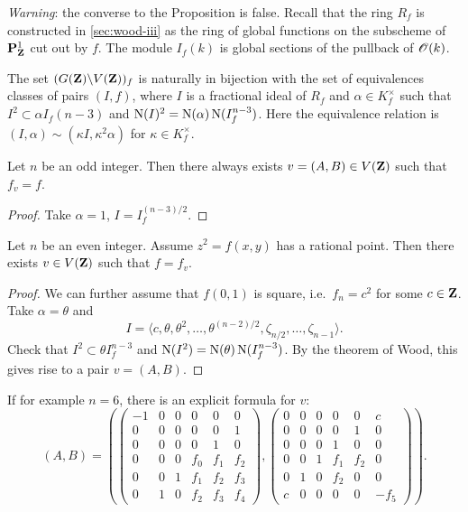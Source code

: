 \emph{Warning}: the converse to the Proposition is false. Recall that the 
ring $R_f$ is constructed in \autoref{sec:wood-iii} as the ring of global 
functions on the subscheme of $\mathbf{P}_{\mathbf{Z}}^1$ cut out by $f$. The module 
$I_f(k)$ is global sections of the pullback of $\mathscr{O}(k)$. 

\begin{theo}[Wood]
The set $(G(\mathbf{Z})\backslash V(\mathbf{Z}))_f$ is naturally in bijection with the set of 
equivalences classes of pairs $(I,f)$, where $I$ is a fractional ideal of $R_f$ 
and $\alpha\in K_f^\times$ such that $I^2\subset \alpha I_f(n-3)$ and 
$\operatorname{N}(I)^2 = \operatorname{N}(\alpha)\operatorname{N}(I_f^{n-3})$. Here the equivalence relation is 
$(I,\alpha)\sim (\kappa I,\kappa^2\alpha)$ for $\kappa\in K_f^\times$. 
\end{theo}

\begin{theo}
Let $n$ be an odd integer. Then there always exists $v=(A,B)\in V(\mathbf{Z})$ such 
that $f_v=f$. 
\end{theo}
\begin{proof}
Take $\alpha=1$, $I=I_f^{(n-3)/2}$. 
\end{proof}

\begin{theo}
Let $n$ be an even integer. Assume $z^2=f(x,y)$ has a rational point. Then 
there exists $v\in V(\mathbf{Z})$ such that $f=f_v$. 
\end{theo}
\begin{proof}
We can further assume that $f(0,1)$ is square, i.e.~$f_n=c^2$ for some 
$c\in \mathbf{Z}$. Take $\alpha=\theta$ and 
\[
  I=\langle c,\theta,\theta^2,\dots,\theta^{(n-2)/2},\zeta_{n/2},\dots,\zeta_{n-1}\rangle .
\]
Check that $I^2\subset \theta I_f^{n-3}$ and 
$\operatorname{N}(I^2)=\operatorname{N}(\theta)\operatorname{N}(I_f^{n-3})$. By the theorem of Wood, this gives 
rise to a pair $v=(A,B)$. 
\end{proof}

If for example $n=6$, there is an explicit formula for $v$: 
\[
  (A,B) = \left(
  \begin{pmatrix} 
    -1 & 0 & 0 & 0 & 0 & 0 \\ 
    0 & 0 & 0 & 0 & 0 & 1 \\ 
    0 & 0 & 0 & 0 & 1 & 0 \\ 
    0 & 0 & 0 & f_0 & f_1 & f_2 \\
    0 & 0 & 1 & f_1 & f_2 & f_3 \\
    0 & 1 & 0 & f_2 & f_3 & f_4 
  \end{pmatrix},
  \begin{pmatrix}
    0 & 0 & 0 & 0 & 0 & c \\
    0 & 0 & 0 & 0 & 1 & 0 \\
    0 & 0 & 0 & 1 & 0 & 0 \\
    0 & 0 & 1 & f_1 & f_2 & 0 \\
    0 & 1 & 0 & f_2 & 0 & 0 \\
    c & 0 & 0 & 0 & 0 & -f_5
  \end{pmatrix}
  \right) .
\]

